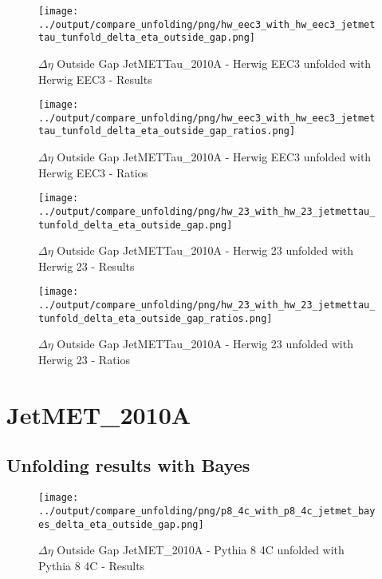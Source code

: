 \documentclass[11pt]{book}
\begin{document}
\begin{figure}[ht]
\centering
\texttt{[image: ../output/compare\_unfolding/png/hw\_eec3\_with\_hw\_eec3\_jetmettau\_tunfold\_delta\_eta\_outside\_gap.png]}
\caption{$\Delta\eta$ Outside Gap JetMETTau\_2010A - Herwig EEC3 unfolded with Herwig EEC3 - Results}
\label{hw_eec3_hw_eec3_jetmettau_tunfold_delta_eta_outside_gap_a}
\end{figure}

\begin{figure}[ht]
\centering
\texttt{[image: ../output/compare\_unfolding/png/hw\_eec3\_with\_hw\_eec3\_jetmettau\_tunfold\_delta\_eta\_outside\_gap\_ratios.png]}
\caption{$\Delta\eta$ Outside Gap JetMETTau\_2010A - Herwig EEC3 unfolded with Herwig EEC3 - Ratios}
\label{hw_eec3_hw_eec3_jetmettau_tunfold_delta_eta_outside_gap_b}
\end{figure}

\begin{figure}[ht]
\centering
\texttt{[image: ../output/compare\_unfolding/png/hw\_23\_with\_hw\_23\_jetmettau\_tunfold\_delta\_eta\_outside\_gap.png]}
\caption{$\Delta\eta$ Outside Gap JetMETTau\_2010A - Herwig 23 unfolded with Herwig 23 - Results}
\label{hw_23_hw_23_jetmettau_tunfold_delta_eta_outside_gap_a}
\end{figure}

\begin{figure}[ht]
\centering
\texttt{[image: ../output/compare\_unfolding/png/hw\_23\_with\_hw\_23\_jetmettau\_tunfold\_delta\_eta\_outside\_gap\_ratios.png]}
\caption{$\Delta\eta$ Outside Gap JetMETTau\_2010A - Herwig 23 unfolded with Herwig 23 - Ratios}
\label{hw_23_hw_23_jetmettau_tunfold_delta_eta_outside_gap_b}
\end{figure}


\clearpage
\section{JetMET\_2010A}
\subsection{Unfolding results with Bayes}

\begin{figure}[ht]
\centering
\texttt{[image: ../output/compare\_unfolding/png/p8\_4c\_with\_p8\_4c\_jetmet\_bayes\_delta\_eta\_outside\_gap.png]}
\caption{$\Delta\eta$ Outside Gap JetMET\_2010A - Pythia 8 4C unfolded with Pythia 8 4C - Results}
\label{p8_p8_jetmet_bayes_delta_eta_outside_gap_a}
\end{figure}
\end{document}
